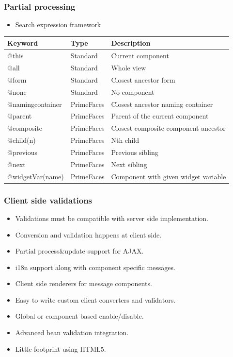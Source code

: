 \documentclass[10pt,xcolor=pdflatex]{beamer}
\begin{document}
\begin{frame}\frametitle{Partial processing}
  \begin{itemize}
    \item Search expression framework
  \end{itemize}
  \begin{footnotesize}
  \begin{table}[]
\centering
\bgroup
\def\arraystretch{1.3}%
\begin{tabular}{|l|l|l|}
\hline
\textbf{Keyword} & \textbf{Type} & \textbf{Description}              \\ \hline
@this            & Standard   & Current component                    \\ \hline
@all             & Standard   & Whole view                           \\ \hline
@form            & Standard   & Closest ancestor form                \\ \hline
@none            & Standard   & No component                         \\ \hline
@namingcontainer & PrimeFaces & Closest ancestor naming container    \\ \hline
@parent          & PrimeFaces & Parent of the current component      \\ \hline
@composite       & PrimeFaces & Closest composite component ancestor \\ \hline
@child(n)        & PrimeFaces & Nth child                            \\ \hline
@previous      & PrimeFaces & Previous sibling                     \\ \hline
@next            & PrimeFaces & Next sibling                         \\ \hline
@widgetVar(name) & PrimeFaces & Component with given widget variable \\ \hline
\end{tabular}
\egroup
\end{table}
\end{footnotesize}
\end{frame}


\begin{frame}\frametitle{Client side validations}
  \begin{itemize}
    \item Validations must be compatible with server side implementation.
	\item Conversion and validation happens at client side.
	\item Partial process\&update support for AJAX.
	\item i18n support along with component specific messages.
	\item Client side renderers for message components.
	\item Easy to write custom client converters and validators.
	\item Global or component based enable/disable.
	\item Advanced bean validation integration.
    \item Little footprint using HTML5.
  \end{itemize}
\end{frame}
\end{document}
